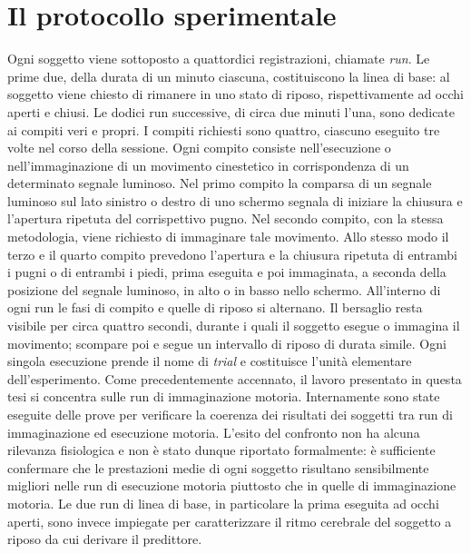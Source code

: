 \section{Il protocollo sperimentale}
Ogni soggetto viene sottoposto a quattordici registrazioni, chiamate \emph{run}. Le prime due, della durata di un minuto ciascuna, costituiscono la linea di base: al soggetto viene chiesto di rimanere in uno stato di riposo, rispettivamente ad occhi aperti e chiusi. Le dodici run successive, di circa due minuti l’una, sono dedicate ai compiti veri e propri.
I compiti richiesti sono quattro, ciascuno eseguito tre volte nel corso della sessione. Ogni compito consiste nell'esecuzione o nell'immaginazione di un movimento cinestetico in corrispondenza di un determinato segnale luminoso. Nel primo compito la comparsa di un segnale luminoso sul lato sinistro o destro di uno schermo segnala di iniziare la chiusura e l'apertura ripetuta del corrispettivo pugno. Nel secondo compito, con la stessa metodologia, viene richiesto di immaginare tale movimento. Allo stesso modo il terzo e il quarto compito prevedono l'apertura e la chiusura ripetuta di entrambi i pugni o di entrambi i piedi, prima eseguita e poi immaginata, a seconda della posizione del segnale luminoso, in alto o in basso nello schermo.
All’interno di ogni run le fasi di compito e quelle di riposo si alternano. Il bersaglio resta visibile per circa quattro secondi, durante i quali il soggetto esegue o immagina il movimento; scompare poi e segue un intervallo di riposo di durata simile. Ogni singola esecuzione prende il nome di \emph{trial} e costituisce l’unità elementare dell’esperimento.
Come precedentemente accennato, il lavoro presentato in questa tesi si concentra sulle run di immaginazione motoria. Internamente sono state eseguite delle prove per verificare la coerenza dei risultati dei soggetti tra run di immaginazione ed esecuzione motoria. L'esito del confronto non ha alcuna rilevanza fisiologica e non è stato dunque riportato formalmente: è sufficiente confermare che le prestazioni medie di ogni soggetto risultano sensibilmente migliori nelle run di esecuzione motoria piuttosto che in quelle di immaginazione motoria. Le due run di linea di base, in particolare la prima eseguita ad occhi aperti, sono invece impiegate per caratterizzare il ritmo cerebrale del soggetto a riposo da cui derivare il predittore.

